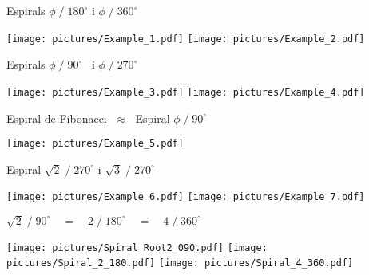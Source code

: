 \documentclass[14pt]{beamer}
\begin{document}
    \begin{frame}{Espirals\; $\phi\;/\;180^\circ$\; i\; $\phi\;/\;360^\circ$}
        \begin{center}
            \texttt{[image: pictures/Example\_1.pdf]}\quad
            \texttt{[image: pictures/Example\_2.pdf]}
        \end{center}
    \end{frame}


    \begin{frame}{Espirals\; $\phi\;/\;90^\circ\phantom{1}$\; i\; $\phi\;/\;270^\circ$}
        \begin{center}
            \texttt{[image: pictures/Example\_3.pdf]}\quad
            \texttt{[image: pictures/Example\_4.pdf]}
        \end{center}
    \end{frame}


    \begin{frame}{Espiral de Fibonacci $\;\approx\;$ Espiral\; $\phi\;/\;90^\circ$}
        \begin{center}
            \texttt{[image: pictures/Example\_5.pdf]}
        \end{center}
    \end{frame}


    \begin{frame}{Espiral\; $\sqrt{2}\;/\;270^\circ$\; i\; $\sqrt{3}\;/\;270^\circ$}
        \begin{center}
            \texttt{[image: pictures/Example\_6.pdf]}\quad
            \texttt{[image: pictures/Example\_7.pdf]}
        \end{center}
    \end{frame}

    
    \begin{frame}{\;\; $\sqrt{2}\;/\;90^\circ \quad=\quad 2\;/\;180^\circ \quad=\quad 4\;/\;360^\circ$}
        \begin{center}
            \texttt{[image: pictures/Spiral\_Root2\_090.pdf]}
            \texttt{[image: pictures/Spiral\_2\_180.pdf]}
            \texttt{[image: pictures/Spiral\_4\_360.pdf]}
        \end{center}
    \end{frame}
\end{document}
